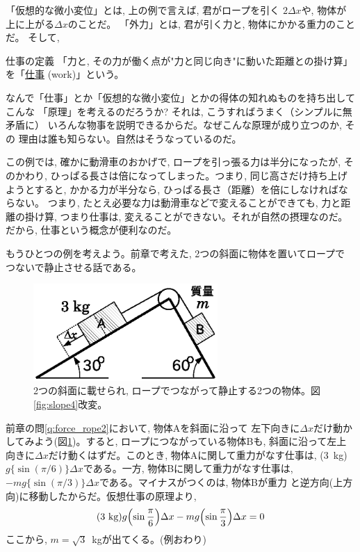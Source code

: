 「仮想的な微小変位」とは, 上の例で言えば, 君がロープを引く
$2\Delta x$や, 物体が上に上がる$\Delta x$のことだ。
「外力」とは, 君が引く力と, 物体にかかる重力のことだ。
そして, 
\begin{itembox}{仕事の定義}
「力と, その力が働く点が"力と同じ向き"に動いた距離との掛け算」を「\underline{仕事} (work)」という。
\end{itembox}

なんで「仕事」とか「仮想的な微小変位」とかの得体の知れぬものを持ち出してこんな
「原理」を考えるのだろうか? それは, こうすればうまく（シンプルに無矛盾に）
いろんな物事を説明できるからだ。なぜこんな原理が成り立つのか, その
理由は誰も知らない。自然はそうなっているのだ。

この例では, 確かに動滑車のおかげで, ロープを引っ張る力は半分になったが, 
そのかわり, ひっぱる長さは倍になってしまった。つまり, 同じ高さだけ持ち上げ
ようとすると, かかる力が半分なら, ひっぱる長さ（距離）を倍にしなければならない。
つまり, たとえ必要な力は動滑車などで変えることができても, 力と距離の掛け算, 
つまり仕事は, 変えることができない。それが自然の摂理なのだ。だから, 
仕事という概念が便利なのだ。

もうひとつの例を考えよう。前章で考えた, 2つの斜面に物体を置いてロープで
つないで静止させる話である。
\begin{figure}[h]
    \centering
    \includegraphics[width=7cm]{slope4b.eps}
    \caption{2つの斜面に載せられ, ロープでつながって静止する2つの物体。図\ref{fig:slope4}改変。}\label{fig:slope4b}
\end{figure}
\begin{exmpl}
前章の問\ref{q:force_rope2}において, 物体Aを斜面に沿って
左下向きに$\Delta x$だけ動かしてみよう(図\ref{fig:slope4b})。すると, ロープにつながっている物体Bも, 
斜面に沿って左上向きに$\Delta x$だけ動くはずだ。このとき, 
物体Aに関して重力がなす仕事は, (3~kg)$g\{\sin(\pi/6)\}\Delta x$である。一方, 
物体Bに関して重力がなす仕事は, $-mg\{\sin(\pi/3)\}\Delta x$である。マイナスがつくのは, 物体Bが重力
と逆方向(上方向)に移動したからだ。仮想仕事の原理より, 
\begin{eqnarray}
(3\text{ kg})g\Bigl(\sin\frac{\pi}{6}\Bigr)\Delta x-mg\Bigl(\sin\frac{\pi}{3}\Bigr)\Delta x=0
\end{eqnarray}
ここから, $m=\sqrt{3}$~kgが出てくる。(例おわり)
\end{exmpl}

